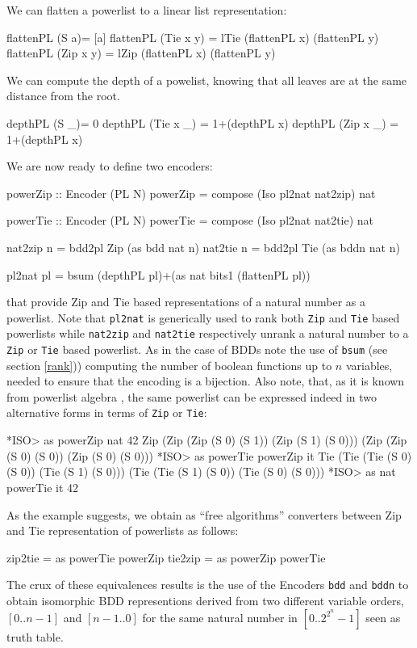 \documentclass[]{INCLUDES/llncs}
\begin{document}
We can flatten a powerlist to a linear list representation:
\begin{code}
flattenPL (S a)= [a]
flattenPL (Tie x y) = lTie (flattenPL x) (flattenPL y)
flattenPL (Zip x y) = lZip (flattenPL x) (flattenPL y)
\end{code}
We can compute the depth of a powelist, knowing that all leaves are at the same
distance from the root.
\begin{code}
depthPL (S _)= 0
depthPL (Tie x _) = 1+(depthPL x)
depthPL (Zip x _) = 1+(depthPL x)
\end{code}
We are now ready to define two encoders:
\begin{code}
powerZip :: Encoder (PL N)
powerZip = compose (Iso pl2nat nat2zip) nat

powerTie :: Encoder (PL N)
powerTie = compose (Iso pl2nat nat2tie) nat

nat2zip n = bdd2pl Zip (as bdd nat n)
nat2tie n = bdd2pl Tie (as bddn nat n)

pl2nat pl = bsum (depthPL pl)+(as nat bits1 (flattenPL pl))
\end{code}
that provide Zip and Tie based representations of a natural number
as a powerlist. Note that {\tt pl2nat} is generically used to
rank both {\tt Zip} and {\tt Tie} based powerlists while
{\tt nat2zip} and {\tt nat2tie} respectively unrank a natural number to 
a {\tt Zip} or {\tt Tie} based powerlist. 
As in the case of BDDs note the use of {\tt bsum} (see section \ref{rank}))
computing the number of boolean functions up to $n$ variables, needed
to ensure that the encoding is a bijection.
Also note, that, as it is known from powerlist algebra
\cite{Misra94powerlist:a}, the same powerlist can be 
expressed indeed in two alternative forms in terms of {\tt Zip} 
or {\tt Tie}:
\begin{codex}
*ISO> as powerZip nat 42
Zip (Zip (Zip (S 0) (S 1)) (Zip (S 1) (S 0))) 
    (Zip (Zip (S 0) (S 0)) (Zip (S 0) (S 0)))
*ISO> as powerTie powerZip it
Tie (Tie (Tie (S 0) (S 0)) (Tie (S 1) (S 0))) 
    (Tie (Tie (S 1) (S 0)) (Tie (S 0) (S 0)))
*ISO> as nat powerTie it
42
\end{codex}
As the example suggests, we obtain as ``free algorithms'' converters between
Zip and Tie representation of powerlists as follows:
\begin{code}
zip2tie = as powerTie powerZip
tie2zip = as powerZip powerTie
\end{code}
The crux of these equivalences results is the use of the Encoders
{\tt bdd} and {\tt bddn} to obtain isomorphic BDD representions derived
from two different variable orders, $[0..n-1]$ and $[n-1..0]$ for the same
natural number in $[0..{2^{2^n}}-1]$ seen as truth table.
\end{document}
